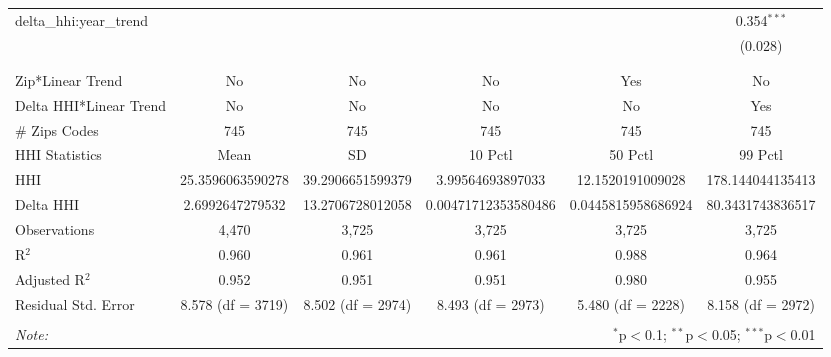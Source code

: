 \begin{table}[H]
{\begin{tabular}{@{\extracolsep{5pt}}lccccc}
  delta\_hhi:year\_trend &  &  &  &  & 0.354$^{***}$ \\  

   &  &  &  &  & (0.028) \\  

   & & & & & \\  

 \hline \\[-1.8ex]  

 Zip*Linear Trend & No & No & No & Yes & No \\  

 Delta HHI*Linear Trend & No & No & No & No & Yes \\  

 # Zips Codes & 745 & 745 & 745 & 745 & 745 \\  

 HHI Statistics & Mean & SD & 10 Pctl & 50 Pctl & 99 Pctl \\  

 HHI & 25.3596063590278 & 39.2906651599379 & 3.99564693897033 & 12.1520191009028 & 178.144044135413 \\  

 Delta HHI & 2.6992647279532 & 13.2706728012058 & 0.00471712353580486 & 0.0445815958686924 & 80.3431743836517 \\  

 Observations & 4,470 & 3,725 & 3,725 & 3,725 & 3,725 \\  

 R$^{2}$ & 0.960 & 0.961 & 0.961 & 0.988 & 0.964 \\  

 Adjusted R$^{2}$ & 0.952 & 0.951 & 0.951 & 0.980 & 0.955 \\  

 Residual Std. Error & 8.578 (df = 3719) & 8.502 (df = 2974) & 8.493 (df = 2973) & 5.480 (df = 2228) & 8.158 (df = 2972) \\  

 \hline  

 \hline \\[-1.8ex]  

 \textit{Note:}  & \multicolumn{5}{r}{$^{*}$p$<$0.1; $^{**}$p$<$0.05; $^{***}$p$<$0.01} \\  

 \end{tabular}}  

 \end{table}  

 


